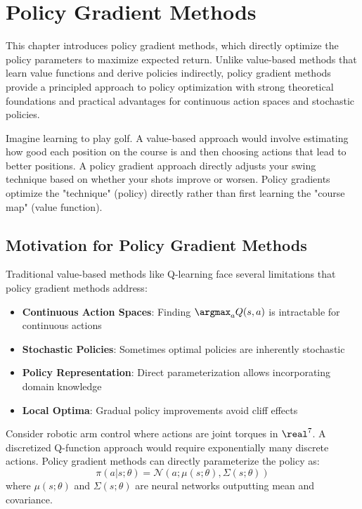 \chapter{Policy Gradient Methods}
\label{ch:policy-gradient}

\begin{keyideabox}
This chapter introduces policy gradient methods, which directly optimize the policy parameters to maximize expected return. Unlike value-based methods that learn value functions and derive policies indirectly, policy gradient methods provide a principled approach to policy optimization with strong theoretical foundations and practical advantages for continuous action spaces and stochastic policies.
\end{keyideabox}

\begin{intuitionbox}
Imagine learning to play golf. A value-based approach would involve estimating how good each position on the course is and then choosing actions that lead to better positions. A policy gradient approach directly adjusts your swing technique based on whether your shots improve or worsen. Policy gradients optimize the "technique" (policy) directly rather than first learning the "course map" (value function).
\end{intuitionbox}

\section{Motivation for Policy Gradient Methods}

Traditional value-based methods like Q-learning face several limitations that policy gradient methods address:

\begin{itemize}
    \item \textbf{Continuous Action Spaces}: Finding $\argmax_a Q(s,a)$ is intractable for continuous actions
    \item \textbf{Stochastic Policies}: Sometimes optimal policies are inherently stochastic
    \item \textbf{Policy Representation}: Direct parameterization allows incorporating domain knowledge
    \item \textbf{Local Optima}: Gradual policy improvements avoid cliff effects
\end{itemize}

\begin{examplebox}
Consider robotic arm control where actions are joint torques in $\real^7$. A discretized Q-function approach would require exponentially many discrete actions. Policy gradient methods can directly parameterize the policy as:
\begin{equation}
\pi(a|s; \theta) = \mathcal{N}(a; \mu(s; \theta), \Sigma(s; \theta))
\end{equation}
where $\mu(s; \theta)$ and $\Sigma(s; \theta)$ are neural networks outputting mean and covariance.
\end{examplebox}

